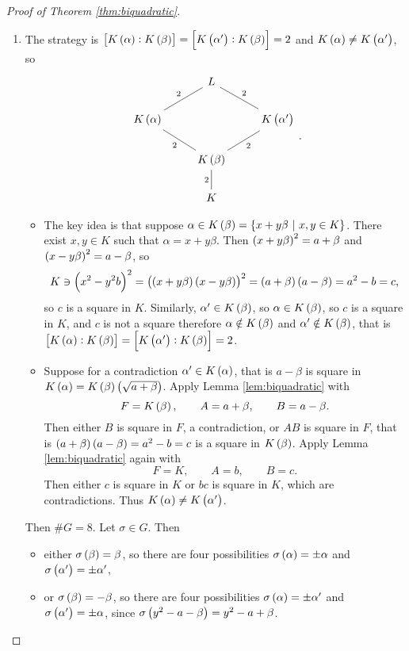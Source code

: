 \begin{proof}[Proof of Theorem \ref{thm:biquadratic}]
\hfill
\begin{enumerate}
\item The strategy is $ \sbr{K\br{\alpha} : K\br{\beta}} = \sbr{K\br{\alpha'} : K\br{\beta}} = 2 $ and $ K\br{\alpha} \ne K\br{\alpha'} $, so
$$
\begin{tikzcd}
& L & \\
K\br{\alpha} \arrow[dash]{ur}{2} & & K\br{\alpha'} \arrow[dash, swap]{ul}{2} \\
& K\br{\beta} \arrow[dash]{ul}{2} \arrow[dash, swap]{ur}{2} & \\
& K \arrow[dash]{u}{2} &
\end{tikzcd}.
$$
\begin{itemize}
\item The key idea is that suppose $ \alpha \in K\br{\beta} = \cbr{x + y\beta \st x, y \in K} $. There exist $ x, y \in K $ such that $ \alpha = x + y\beta $. Then $ \br{x + y\beta}^2 = a + \beta $ and $ \br{x - y\beta}^2 = a - \beta $, so
$$ K \ni \br{x^2 - y^2b}^2 = \br{\br{x + y\beta}\br{x - y\beta}}^2 = \br{a + \beta}\br{a - \beta} = a^2 - b = c, $$
so $ c $ is a square in $ K $. Similarly, $ \alpha' \in K\br{\beta} $, so $ \alpha \in K\br{\beta} $, so $ c $ is a square in $ K $, and $ c $ is not a square therefore $ \alpha \notin K\br{\beta} $ and $ \alpha' \notin K\br{\beta} $, that is $ \sbr{K\br{\alpha} : K\br{\beta}} = \sbr{K\br{\alpha'} : K\br{\beta}} = 2 $.
\item Suppose for a contradiction $ \alpha' \in K\br{\alpha} $, that is $ a - \beta $ is square in $ K\br{\alpha} = K\br{\beta}\br{\sqrt{a + \beta}} $. Apply Lemma \ref{lem:biquadratic} with
$$ F = K\br{\beta}, \qquad A = a + \beta, \qquad B = a - \beta. $$
Then either $ B $ is square in $ F $, a contradiction, or $ AB $ is square in $ F $, that is $ \br{a + \beta}\br{a - \beta} = a^2 - b = c $ is a square in $ K\br{\beta} $. Apply Lemma \ref{lem:biquadratic} again with
$$ F = K, \qquad A = b, \qquad B = c. $$
Then either $ c $ is square in $ K $ or $ bc $ is square in $ K $, which are contradictions. Thus $ K\br{\alpha} \ne K\br{\alpha'} $.
\end{itemize}
Then $ \#G = 8 $. Let $ \sigma \in G $. Then
\begin{itemize}
\item either $ \sigma\br{\beta} = \beta $, so there are four possibilities $ \sigma\br{\alpha} = \pm\alpha $ and $ \sigma\br{\alpha'} = \pm\alpha' $,
\item or $ \sigma\br{\beta} = -\beta $, so there are four possibilities $ \sigma\br{\alpha} = \pm\alpha' $ and $ \sigma\br{\alpha'} = \pm\alpha $, since $ \sigma\br{y^2 - a - \beta} = y^2 - a + \beta $.

\end{itemize}
\end{enumerate}
\end{proof}

